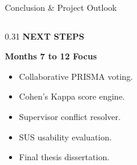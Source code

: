 \documentclass[aspectratio=169,10pt]{beamer}
\begin{document}
\begin{frame}{Conclusion \& Project Outlook}
\begin{columns}[T]
  \begin{column}{0.31\textwidth}
    {\fontsize{8.5pt}{10.5pt}\selectfont\bfseries\color{SubText} NEXT STEPS}\par\vspace{3pt}
    {\fontsize{12pt}{14.5pt}\selectfont\bfseries\color{DarkText} Months 7 to 12 Focus}\par\vspace{6pt}
    {\fontsize{9pt}{12pt}\selectfont\color{DarkText}
    \begin{itemize}\setlength{\itemsep}{4pt}
      \item Collaborative PRISMA voting.
      \item Cohen's Kappa score engine.
      \item Supervisor conflict resolver.
      \item SUS usability evaluation.
      \item Final thesis dissertation.
    \end{itemize}}
  \end{column}
\end{columns}
\end{frame}
\end{document}
